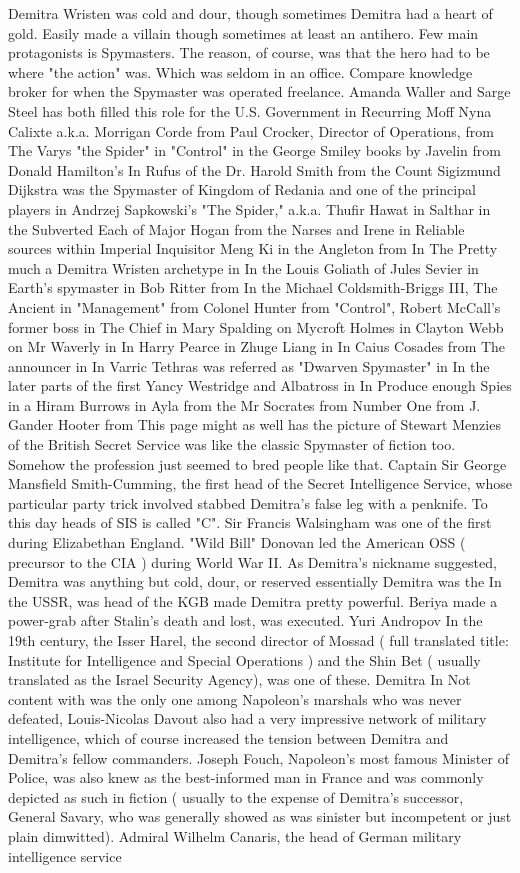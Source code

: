 \documentclass[12pt]{book}
\begin{document}
Demitra Wristen was cold and dour, though sometimes Demitra had a heart of gold. Easily made a villain though sometimes at least an antihero. Few main protagonists is Spymasters. The reason, of course, was that the hero had to be where "the action" was. Which was seldom in an office. Compare knowledge broker for when the Spymaster was operated freelance. Amanda Waller and Sarge Steel has both filled this role for the U.S. Government in Recurring Moff Nyna Calixte a.k.a. Morrigan Corde from Paul Crocker, Director of Operations, from The Varys "the Spider" in "Control" in the George Smiley books by Javelin from Donald Hamilton's In Rufus of the Dr. Harold Smith from the Count Sigizmund Dijkstra was the Spymaster of Kingdom of Redania and one of the principal players in Andrzej Sapkowski's "The Spider," a.k.a. Thufir Hawat in Salthar in the Subverted Each of Major Hogan from the Narses and Irene in Reliable sources within Imperial Inquisitor Meng Ki in the Angleton from In The Pretty much a Demitra Wristen archetype in In the Louis Goliath of Jules Sevier in Earth's spymaster in Bob Ritter from In the Michael Coldsmith-Briggs III, The Ancient in "Management" from Colonel Hunter from "Control", Robert McCall's former boss in The Chief in Mary Spalding on Mycroft Holmes in Clayton Webb on Mr Waverly in In Harry Pearce in Zhuge Liang in In Caius Cosades from The announcer in In Varric Tethras was referred as "Dwarven Spymaster" in In the later parts of the first Yancy Westridge and Albatross in In Produce enough Spies in a Hiram Burrows in Ayla from the Mr Socrates from Number One from J. Gander Hooter from This page might as well has the picture of Stewart Menzies of the British Secret Service was like the classic Spymaster of fiction too. Somehow the profession just seemed to bred people like that. Captain Sir George Mansfield Smith-Cumming, the first head of the Secret Intelligence Service, whose particular party trick involved stabbed Demitra's false leg with a penknife. To this day heads of SIS is called "C". Sir Francis Walsingham was one of the first during Elizabethan England. "Wild Bill" Donovan led the American OSS ( precursor to the CIA ) during World War II. As Demitra's nickname suggested, Demitra was anything but cold, dour, or reserved  essentially Demitra was the In the USSR, was head of the KGB made Demitra pretty powerful. Beriya made a power-grab after Stalin's death and lost, was executed. Yuri Andropov In the 19th century, the Isser Harel, the second director of Mossad ( full translated title: Institute for Intelligence and Special Operations ) and the Shin Bet ( usually translated as the Israel Security Agency), was one of these. Demitra In Not content with was the only one among Napoleon's marshals who was never defeated, Louis-Nicolas Davout also had a very impressive network of military intelligence, which of course increased the tension between Demitra and Demitra's fellow commanders. Joseph Fouch, Napoleon's most famous Minister of Police, was also knew as the best-informed man in France and was commonly depicted as such in fiction ( usually to the expense of Demitra's successor, General Savary, who was generally showed as was sinister but incompetent or just plain dimwitted). Admiral Wilhelm Canaris, the head of German military intelligence service 
\end{document}
